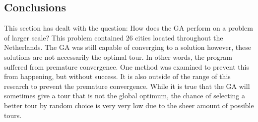 \subsection{Conclusions}
\par
This section has dealt with the question: How does the GA perform on a problem of larger scale? This problem contained 26 cities located throughout the Netherlands. The GA was still capable of converging to a solution however, these solutions are not necessarily the optimal tour. In other words, the program suffered from premature convergence. One method was examined to prevent this from happening, but without success. It is also outside of the range of this research to prevent the premature convergence. While it is true that the GA will sometimes give a tour that is not the global optimum, the chance of selecting a better tour by random choice is very very low due to the sheer amount of possible tours. 


